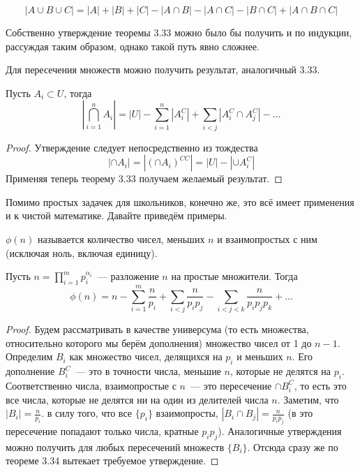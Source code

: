 $$|A\cup B \cup C| = |A| + |B| + |C| - |A\cap B| - |A\cap C| - |B\cap C| + |A\cap B \cap C|$$

Собственно утверждение теоремы 3.33 можно было бы получить и по индукции, рассуждая таким образом, однако такой путь явно сложнее.

Для пересечения множеств можно получить результат, аналогичный 3.33.

\begin{thm}
Пусть $A_i \subset U$, тогда
$$\left|\bigcap_{i=1}^nA_i\right| = |U| - \sum_{i=1}^n|A_i^C| + \sum_{i<j}|A_i^C\cap A_j^C| - \ldots$$
\end{thm}
\begin{proof}
Утверждение следует непосредственно из тождества
$$|\cap A_i| = |(\cap A_i)^{CC}| = |U| - |\cup A_i^C|$$
Применяя теперь теорему 3.33 получаем желаемый результат.
\end{proof}

Помимо простых задачек для школьников, конечно же, это всё имеет применения и к чистой математике. Давайте приведём примеры.

\begin{definition}
 $\phi(n)$ называется количество чисел, меньших $n$ и взаимопростых с ним (исключая ноль, включая единицу).
\end{definition}

\begin{thm}
Пусть $n=\prod_{i=1}^m p_i^{\alpha_i}$~--- разложение $n$ на простые множители. Тогда
$$\phi(n) = n - \sum_{i=1}^m\frac{n}{p_i} + \sum_{i<j}\frac{n}{p_ip_j} - \sum_{i<j<k}\frac{n}{p_ip_jp_k} + \ldots$$
\end{thm}
\begin{proof}
Будем рассматривать в качестве универсума (то есть множества, относительно которого мы берём дополнения) множество чисел от 1 до $n-1$. Определим $B_i$ как множество чисел, делящихся на $p_i$ и меньших $n$. Его дополнение $B_i^C$~--- это в точности числа, меньшие $n$, которые не делятся на $p_i$. Соответственно числа, взаимопростые с $n$~--- это пересечение $\cap B_i^C$, то есть это все числа, которые не делятся ни на один из делителей числа $n$. Заметим, что $|B_i| = \frac{n}{p_i}$.  в силу того, что все $\{p_i\}$ взаимопросты, $|B_i\cap B_j| = \frac{n}{p_ip_j}$ (в это пересечение попадают только числа, кратные $p_ip_j$). Аналогичные утверждения можно получить для любых пересечений множеств $\{B_i\}$. Отсюда сразу же по теореме 3.34 вытекает требуемое утверждение.
\end{proof}

